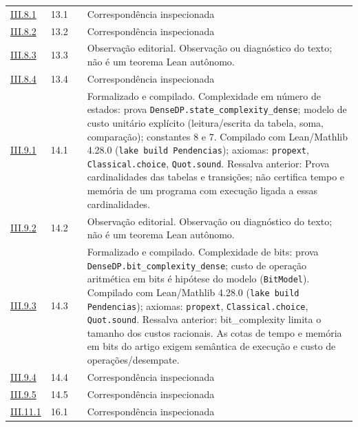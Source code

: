 \documentclass[12pt,a4paper]{article}
\theoremstyle{preciso}
\theoremstyle{definition}
\newcommand{\code}[1]{\nolinkurl{#1}}
\theoremstyle{preciso}
\theoremstyle{preciso}
\theoremstyle{preciso}
\theoremstyle{preciso}
\theoremstyle{definition}
\theoremstyle{preciso}
\theoremstyle{definition}
\theoremstyle{preciso}
\theoremstyle{preciso}
\theoremstyle{definition}
\begin{document}
\begin{singlespace}
\begin{longtable}{@{}p{.11\linewidth}p{.09\linewidth}p{.09\linewidth}p{.59\linewidth}@{}}
\hyperref[map:artigo_2:8.1]{III.8.1} & 13.1 & \pageref{map:artigo_2:8.1} & Correspondência inspecionada\\[4pt]
\hyperref[map:artigo_2:8.2]{III.8.2} & 13.2 & \pageref{map:artigo_2:8.2} & Correspondência inspecionada\\[4pt]
\hyperref[map:artigo_2:8.3]{III.8.3} & 13.3 & \pageref{map:artigo_2:8.3} & Observação editorial. Observação ou diagnóstico do texto; não é um teorema Lean autônomo.\\[4pt]
\hyperref[map:artigo_2:8.4]{III.8.4} & 13.4 & \pageref{map:artigo_2:8.4} & Correspondência inspecionada\\[4pt]
\hyperref[map:artigo_2:9.1]{III.9.1} & 14.1 & \pageref{map:artigo_2:9.1} & Formalizado e compilado. Complexidade em número de estados: prova \code{DenseDP.state_complexity_dense}; modelo de custo unitário explícito (leitura/escrita da tabela, soma, comparação); constantes 8 e 7. Compilado com Lean/Mathlib 4.28.0 (\texttt{lake build Pendencias}); axiomas: \texttt{propext}, \texttt{Classical.choice}, \texttt{Quot.sound}. Ressalva anterior: Prova cardinalidades das tabelas e transições; não certifica tempo e memória de um programa com execução ligada a essas cardinalidades.\\[4pt]
\hyperref[map:artigo_2:9.2]{III.9.2} & 14.2 & \pageref{map:artigo_2:9.2} & Observação editorial. Observação ou diagnóstico do texto; não é um teorema Lean autônomo.\\[4pt]
\hyperref[map:artigo_2:9.3]{III.9.3} & 14.3 & \pageref{map:artigo_2:9.3} & Formalizado e compilado. Complexidade de bits: prova \code{DenseDP.bit_complexity_dense}; custo de operação aritmética em bits é hipótese do modelo (\code{BitModel}). Compilado com Lean/Mathlib 4.28.0 (\texttt{lake build Pendencias}); axiomas: \texttt{propext}, \texttt{Classical.choice}, \texttt{Quot.sound}. Ressalva anterior: bit\_complexity limita o tamanho dos custos racionais. As cotas de tempo e memória em bits do artigo exigem semântica de execução e custo de operações/desempate.\\[4pt]
\hyperref[map:artigo_2:9.4]{III.9.4} & 14.4 & \pageref{map:artigo_2:9.4} & Correspondência inspecionada\\[4pt]
\hyperref[map:artigo_2:9.5]{III.9.5} & 14.5 & \pageref{map:artigo_2:9.5} & Correspondência inspecionada\\[4pt]
\hyperref[map:artigo_2:11.1]{III.11.1} & 16.1 & \pageref{map:artigo_2:11.1} & Correspondência inspecionada\\[4pt]

\end{longtable}
\end{singlespace}
\end{document}
